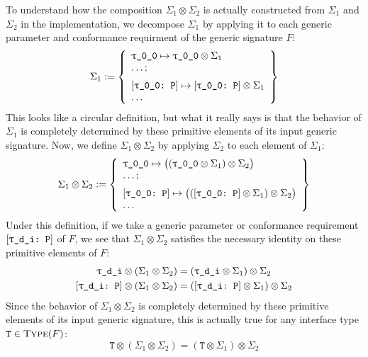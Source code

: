 \documentclass[../generics]{subfiles}
\begin{document}
To understand how the composition $\Sigma_1\otimes\Sigma_2$ is actually constructed from $\Sigma_1$ and $\Sigma_2$ in the implementation, we decompose $\Sigma_1$ by applying it to each generic parameter and conformance requirment of the generic signature $F$:
\[\Sigma_1 := \SubstMapLongC{
\SubstType{\ttgp{0}{0}}{$\ttgp{0}{0}\otimes\Sigma_1$}\\
\ldots
}{
\ConfReq{\ttgp{0}{0}}{P}\mapsto\ConfReq{\ttgp{0}{0}}{P}\otimes\Sigma_1\\
\ldots
}\]
This looks like a circular definition, but what it really says is that the behavior of $\Sigma_1$ is completely determined by these primitive elements of its input generic signature. Now, we define $\Sigma_1\otimes\Sigma_2$ by applying $\Sigma_2$ to each element of $\Sigma_1$:
\[
\Sigma_1\otimes\Sigma_2 := \SubstMapLongC{
\SubstType{\ttgp{0}{0}}{$\bigl((\ttgp{0}{0}\otimes\Sigma_1)\otimes\Sigma_2\bigr)$}\\
\ldots
}{
\ConfReq{\ttgp{0}{0}}{P}\mapsto\bigl((\ConfReq{\ttgp{0}{0}}{P}\otimes\Sigma_1)\otimes\Sigma_2\bigr)\\
\ldots
}
\]
Under this definition, if we take a generic parameter  or conformance requirement $[\texttt{\texttt{$\uptau$\_d\_i}:~P}]$ of $F$, we see that $\Sigma_1\otimes\Sigma_2$ satisfies the necessary identity on these primitive elements of $F$:
\begin{gather*}
\ttgp{d}{i}\otimes(\Sigma_1\otimes\Sigma_2)=(\ttgp{d}{i}\otimes\Sigma_1)\otimes\Sigma_2\\
\ConfReq{\ttgp{d}{i}}{P}\otimes(\Sigma_1\otimes\Sigma_2)=(\ConfReq{\ttgp{d}{i}}{P}\otimes\Sigma_1)\otimes\Sigma_2
\end{gather*}
Since the behavior of $\Sigma_1\otimes\Sigma_2$ is completely determined by these primitive elements of its input generic signature, this is actually true for any interface type $\texttt{T}\in\textsc{Type}({F})$:
\[\texttt{T}\otimes(\Sigma_1\otimes\Sigma_2)=(\texttt{T}\otimes\Sigma_1)\otimes\Sigma_2\]

\newcommand{\FirstMapInExample}{\SubstMap{
\SubstType{T}{Array<A>},\,\SubstType{U}{A}
}}
\newcommand{\SecondMapInExample}{\SubstMap{
\SubstType{A}{Int}
}}
\newcommand{\ThirdMapInExample}{\SubstMap{
\SubstType{T}{Array<Int>},\,\SubstType{U}{Int}
}}
\end{document}
